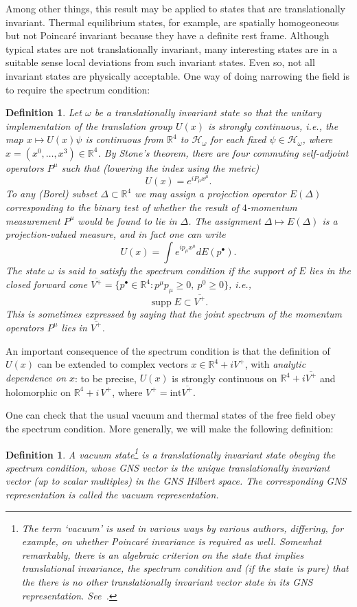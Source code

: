 \documentclass[12pt]{article}
\newcommand{\1}{\mathds{1}}                         %
\newcommand{\RR}{\mathbb{R}}           %
\newcommand{\HH}{{\mathcal{H}}}
\newtheorem{definition}[theorem]{Definition}
\DeclareMathOperator{\supp}{supp}
\begin{document}
Among other things, this result may be applied to states that are   translationally invariant. Thermal equilibrium states, for example, are spatially homogeoneous but not Poincar\'e invariant because they have a definite rest frame. Although typical states are not translationally invariant, many interesting states are in a suitable sense local deviations from such invariant states. Even so, not all invariant states are physically acceptable. One way of doing narrowing the field is to require the spectrum condition:
\begin{definition}
	Let $\omega$ be a translationally invariant state so that the unitary implementation of the translation group $U(x)$ is \emph{strongly continuous}, i.e., the map $x\mapsto U(x)\psi$ is continuous from $\RR^4$ to $\HH_\omega$ for each fixed $\psi\in\HH_\omega$, where $x=(x^0,\ldots,x^3)\in\RR^4$.
	By Stone's theorem, there are four commuting self-adjoint operators $P^\mu$ such that 
	(lowering the index using the metric)
	\[
	U(x) = e^{iP_\mu x^\mu}.
	\]
	To any (Borel) subset $\Delta\subset \RR^4$ we may assign a projection operator $E(\Delta)$
	corresponding to the binary test of whether the result of $4$-momentum measurement $P^\mu$ would be found to lie in $\Delta$. The assignment $\Delta\mapsto E(\Delta)$ is a \emph{projection-valued measure}, and in fact one can write 
	\[
	U(x) = \int e^{ip_\mu x^\mu}dE(p^\bullet).
	\]
	The state $\omega$ is said to satisfy the \emph{spectrum condition} if the support of $E$ lies in the \emph{closed forward cone} $\overline{V^+}=\{p^\bullet\in\RR^4: p^\mu p_\mu\ge 0,~p^0\ge 0\}$, i.e.,
	\[
	\supp E \subset \overline{V^+}.
	\]
	This is sometimes expressed by saying that the joint spectrum of the momentum operators $P^\mu$ lies in $\overline{V^+}$. 
\end{definition}	 
An important consequence of the spectrum condition is that the definition of $U(x)$ can be extended to complex vectors $x\in \RR^4+iV^+$, with \emph{analytic dependence on $x$}: to be precise, $U(x)$ is strongly continuous on $\RR^4+i\overline{V^+}$ and holomorphic on $\RR^4+i\,V^+$, where $V^+=\text{int} \overline{V^+}$.  

One can check that the usual vacuum and thermal states of the free field obey the spectrum condition. More generally, we will make the following definition:
\begin{definition}\label{def:vacuum}
	A \emph{vacuum state}\footnote{The term `vacuum' is used in various ways by various authors, differing, for example, on whether Poincar\'e invariance is required as well. Somewhat remarkably, there is an algebraic criterion on the state that implies translational invariance, the spectrum condition and (if the state is pure) that the there is no other translationally invariant vector state in its GNS representation. See~\cite{Araki}.} is a translationally invariant state obeying the spectrum condition, whose GNS vector is the unique translationally invariant vector (up to scalar multiples) in the GNS Hilbert space. The corresponding GNS representation is called the \emph{vacuum representation.}
\end{definition}
\end{document}
